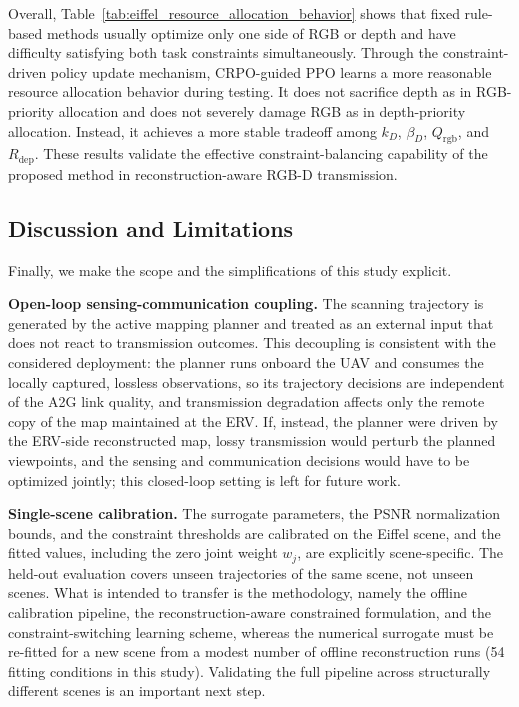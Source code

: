 \documentclass[journal]{IEEEtran}
\begin{document}
Overall, Table~\ref{tab:eiffel_resource_allocation_behavior} shows that fixed rule-based methods usually optimize only one side of RGB or depth and have difficulty satisfying both task constraints simultaneously. Through the constraint-driven policy update mechanism, CRPO-guided PPO learns a more reasonable resource allocation behavior during testing. It does not sacrifice depth as in RGB-priority allocation and does not severely damage RGB as in depth-priority allocation. Instead, it achieves a more stable tradeoff among $k_D$, $\beta_D$, $Q_{\mathrm{rgb}}$, and $R_{\mathrm{dep}}$. These results validate the effective constraint-balancing capability of the proposed method in reconstruction-aware RGB-D transmission.

\subsection{Discussion and Limitations}
\label{sec:limitations}

Finally, we make the scope and the simplifications of this study explicit.

\textbf{Open-loop sensing-communication coupling.} The scanning trajectory is generated by the active mapping planner and treated as an external input that does not react to transmission outcomes. This decoupling is consistent with the considered deployment: the planner runs onboard the UAV and consumes the locally captured, lossless observations, so its trajectory decisions are independent of the A2G link quality, and transmission degradation affects only the remote copy of the map maintained at the ERV. If, instead, the planner were driven by the ERV-side reconstructed map, lossy transmission would perturb the planned viewpoints, and the sensing and communication decisions would have to be optimized jointly; this closed-loop setting is left for future work.

\textbf{Single-scene calibration.} The surrogate parameters, the PSNR normalization bounds, and the constraint thresholds are calibrated on the Eiffel scene, and the fitted values, including the zero joint weight $w_j$, are explicitly scene-specific. The held-out evaluation covers unseen trajectories of the same scene, not unseen scenes. What is intended to transfer is the methodology, namely the offline calibration pipeline, the reconstruction-aware constrained formulation, and the constraint-switching learning scheme, whereas the numerical surrogate must be re-fitted for a new scene from a modest number of offline reconstruction runs (54 fitting conditions in this study). Validating the full pipeline across structurally different scenes is an important next step.
\end{document}
